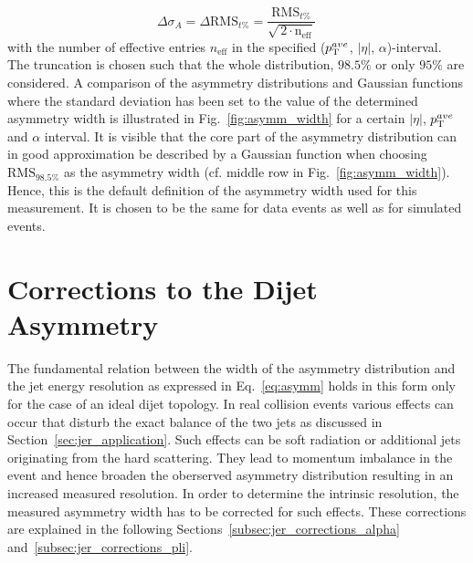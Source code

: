 \begin{equation}
\Delta \sigma_A = \Delta \mathrm{RMS}_{t\%} = \frac{\mathrm{RMS}_{t\%}}{\sqrt{\, 2 \cdot \mathrm{n_\mathrm{eff}}}} \,
\end{equation} 
with the number of effective entries $n_\mathrm{eff}$ in the specified ($p_{\text{T}}^{ave}$, $|\eta|$, $\alpha$)-interval. The truncation is chosen such that the whole distribution, $98.5\%$ or only $95\%$ are considered. A comparison of the asymmetry distributions and Gaussian functions where the standard deviation has been set to the value of the determined asymmetry width is illustrated in Fig.~\ref{fig:asymm_width} for a certain $|\eta|$, $p_{\text{T}}^{ave}$ and $\alpha$ interval. It is visible that the core part of the asymmetry distribution can in good approximation be described by a Gaussian function when choosing $\mathrm{RMS}_{98.5\%}$ as the asymmetry width (cf. middle row in Fig.~\ref{fig:asymm_width}). Hence, this is the default definition of the asymmetry width used for this measurement. It is chosen to be the same for data events as well as for simulated events.  

\section{Corrections to the Dijet Asymmetry}
\label{sec:jer_corrections}
The fundamental relation between the width of the asymmetry distribution and the jet energy resolution as expressed in Eq.~\ref{eq:asymm} holds in this form only for the case of an ideal dijet topology. In real collision events various effects can occur that disturb the exact balance of the two jets as discussed in Section~\ref{sec:jer_application}. Such effects can be soft radiation or additional jets originating from the hard scattering. They lead to momentum imbalance in the event and hence broaden the oberserved asymmetry distribution resulting in an increased measured resolution. In order to determine the intrinsic resolution, the measured asymmetry width has to be corrected for such effects. These corrections are explained in the following Sections~\ref{subsec:jer_corrections_alpha} and~\ref{subsec:jer_corrections_pli}.

